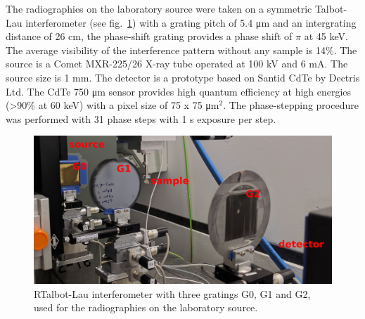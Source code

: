 \documentclass[preprint,12pt]{elsarticle}
\begin{document}
The radiographies on the laboratory source were taken on a symmetric
Talbot-Lau interferometer (see fig.~\ref{248327}) with a grating pitch of 5.4 μm and an intergrating
distance of 26 cm, the phase-shift grating provides a phase shift of $\pi$
at 45 keV. The average visibility of the interference pattern without any
sample is 14\%. The source is a Comet MXR-225/26 X-ray tube operated at 100
kV and 6 mA. The source size is 1 mm. The detector is a prototype based on
Santid CdTe by Dectris Ltd. The CdTe 750 μm sensor provides high quantum
efficiency at high energies (>90\% at 60 keV) with a pixel size of 75 x 75
μm$^2$. The phase-stepping procedure was performed with 31 phase steps with
1 s exposure per step.
\begin{figure}[h!]
\begin{center}
\includegraphics[width=0.70\columnwidth]{figures/lung-setup/lung-setup}
\caption{{RTalbot-Lau interferometer with three gratings G0, G1 and G2, used for
the radiographies on the laboratory source.
{\label{248327}}%
}}
\end{center}
\end{figure}
\end{document}
